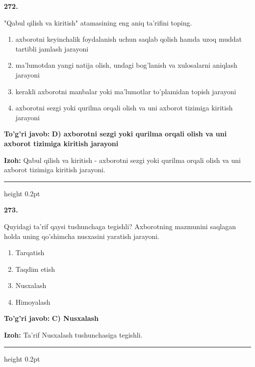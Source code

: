 \documentclass[10pt,a4paper,oneside]{article}
\begin{document}
\noindent\textbf{\color{ink}272.}
\par
"Qabul qilish va kiritish" atamasining eng aniq ta'rifini toping.
\begin{enumerate}[label=\Alph*),leftmargin=9mm]
\item axborotni keyinchalik foydalanish uchun saqlab qolish hamda uzoq muddat tartibli jamlash jarayoni
\item ma'lumotdan yangi natija olish, undagi bog'lanish va xulosalarni aniqlash jarayoni
\item kerakli axborotni manbalar yoki ma'lumotlar to'plamidan topish jarayoni
\item axborotni sezgi yoki qurilma orqali olish va uni axborot tizimiga kiritish jarayoni
\end{enumerate}
\begin{tcolorbox}[enhanced,breakable,colback=teal!4,colframe=teal!50!black,boxrule=0.5pt,arc=1.1mm,left=3mm,right=3mm,top=1.7mm,bottom=1.7mm,before skip=2mm,after skip=2mm]
\textbf{\color{teal}To'g'ri javob:} \textbf{D) axborotni sezgi yoki qurilma orqali olish va uni axborot tizimiga kiritish jarayoni}
\par\smallskip
\textbf{Izoh:} Qabul qilish va kiritish - axborotni sezgi yoki qurilma orqali olish va uni axborot tizimiga kiritish jarayoni.
\end{tcolorbox}
\vspace{2mm}\hrule height 0.2pt \vspace{3mm}

\noindent\textbf{\color{ink}273.}
\par
Quyidagi ta'rif qaysi tushunchaga tegishli? Axborotning mazmunini saqlagan holda uning qo'shimcha nusxasini yaratish jarayoni.
\begin{enumerate}[label=\Alph*),leftmargin=9mm]
\item Tarqatish
\item Taqdim etish
\item Nusxalash
\item Himoyalash
\end{enumerate}
\begin{tcolorbox}[enhanced,breakable,colback=teal!4,colframe=teal!50!black,boxrule=0.5pt,arc=1.1mm,left=3mm,right=3mm,top=1.7mm,bottom=1.7mm,before skip=2mm,after skip=2mm]
\textbf{\color{teal}To'g'ri javob:} \textbf{C) Nusxalash}
\par\smallskip
\textbf{Izoh:} Ta'rif Nusxalash tushunchasiga tegishli.
\end{tcolorbox}
\vspace{2mm}\hrule height 0.2pt \vspace{3mm}
\end{document}
